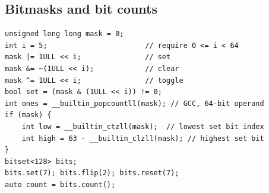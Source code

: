 \subsection{Bitmasks and bit counts}
\begin{lstlisting}[style=cpp]
unsigned long long mask = 0;
int i = 5;                       // require 0 <= i < 64
mask |= 1ULL << i;               // set
mask &= ~(1ULL << i);            // clear
mask ^= 1ULL << i;               // toggle
bool set = (mask & (1ULL << i)) != 0;
int ones = __builtin_popcountll(mask); // GCC, 64-bit operand
if (mask) {
    int low = __builtin_ctzll(mask);  // lowest set bit index
    int high = 63 - __builtin_clzll(mask); // highest set bit
}
bitset<128> bits;
bits.set(7); bits.flip(2); bits.reset(7);
auto count = bits.count();
\end{lstlisting}
